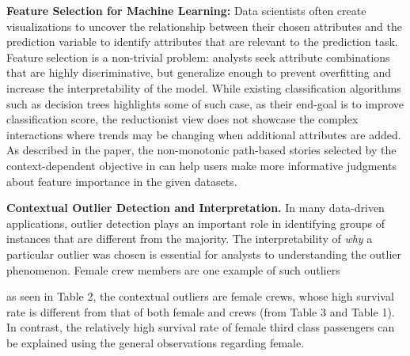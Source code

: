 \textbf{Feature Selection for Machine Learning:} Data scientists often create visualizations to uncover the relationship between their chosen attributes and the prediction variable to identify attributes that are relevant to the prediction task. Feature selection is a non-trivial problem: analysts seek attribute combinations that are highly discriminative, but generalize enough to prevent overfitting and increase the interpretability of the model. While existing classification algorithms such as decision trees highlights some of such case, as their end-goal is to improve classification score, the reductionist view does not showcase the complex interactions where trends may be changing when additional attributes are added. As described in the paper, the non-monotonic path-based stories selected by the context-dependent objective in \system can help users make more informative judgments about feature importance in the given datasets. 

\textbf{Contextual Outlier Detection and Interpretation.} In many data-driven applications, outlier detection plays an important role in identifying groups of instances that are different from the majority. The interpretability of \textit{why} a particular outlier was chosen is essential for analysts to understanding the outlier phenomenon. Female crew members are one example of such outliers

as seen in Table 2, the contextual outliers are female crews, whose high survival rate is different from that of both female and crews (from Table 3 and Table 1). In contrast, the relatively high survival rate of female third class passengers can be explained using the general observations regarding female.

